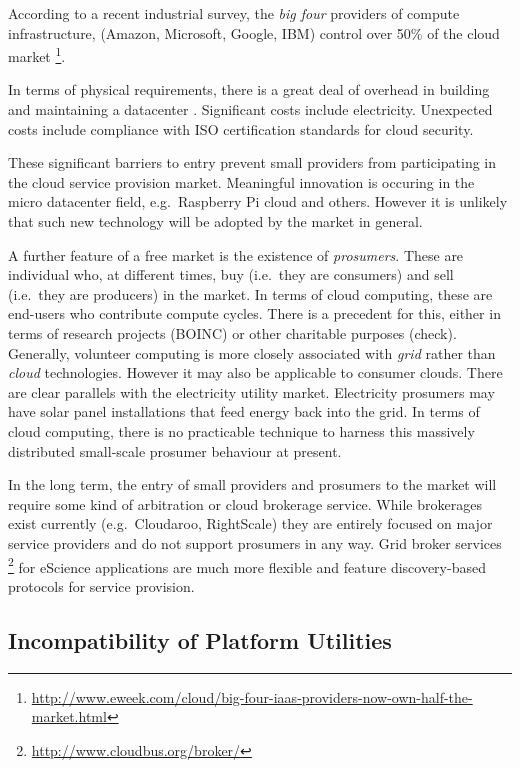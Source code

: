 \documentclass[conference,10pt]{IEEEtran}
\begin{document}
According to a recent industrial survey, the \emph{big four} providers of compute infrastructure, (Amazon, Microsoft, Google, IBM) control over 50\% of the cloud market \footnote{\url{http://www.eweek.com/cloud/big-four-iaas-providers-now-own-half-the-market.html}}.

In terms of physical requirements, there is a great deal of overhead in building and maintaining a datacenter \cite{greenberg08cost}. Significant costs include electricity. Unexpected costs include compliance with ISO certification standards for cloud security.

These significant barriers to entry prevent small providers from participating in the cloud service provision market. Meaningful innovation is occuring in the micro datacenter field, e.g.\ Raspberry Pi cloud and others.
However it is unlikely that such new technology will be adopted by the market in general.


A further feature of a free market is the existence of \emph{prosumers}. These are individual who, at different times,  buy (i.e.\ they are consumers) and sell (i.e.\ they are producers) in the market. In terms of cloud computing, these are end-users who contribute compute cycles. There is a precedent for this, either in terms of research projects (BOINC) or other charitable purposes (check). Generally, volunteer computing is more closely associated with \emph{grid} rather than \emph{cloud} technologies. However it may also be applicable to consumer clouds. There are clear parallels with the electricity utility market. Electricity prosumers may have solar panel installations that feed energy back into the grid. In terms of cloud computing, there is no practicable technique to harness this massively distributed small-scale prosumer behaviour at present.

In the long term, the entry of small providers and prosumers to the market will require some kind of arbitration or cloud brokerage service. While brokerages exist currently (e.g.\ Cloudaroo, RightScale) they are entirely focused on major service providers and do not support prosumers in any way.
Grid broker services \footnote{\url{http://www.cloudbus.org/broker/}} for eScience applications are much more flexible and feature discovery-based protocols for service provision. 


\subsection{Incompatibility of Platform Utilities}
\end{document}
